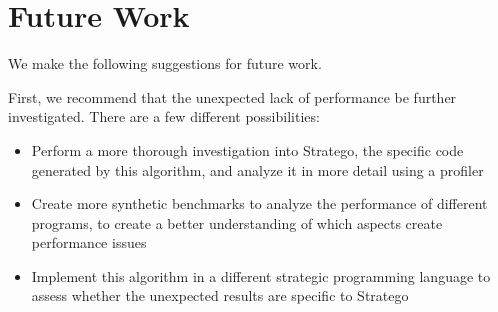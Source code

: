 \section{Future Work}
We make the following suggestions for future work.

First, we recommend that the unexpected lack of performance be further investigated. There are a few different possibilities:
\begin{itemize}
    \item Perform a more thorough investigation into Stratego, the specific code generated by this algorithm, and analyze it in more detail using a profiler
    \item Create more synthetic benchmarks to analyze the performance of different programs, to create a better understanding of which aspects create performance issues
    \item Implement this algorithm in a different strategic programming language to assess whether the unexpected results are specific to Stratego
\end{itemize}

